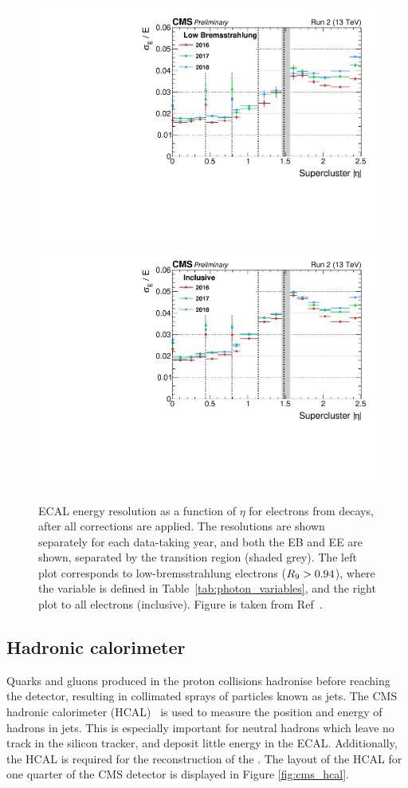 \begin{figure}
  \centering
  \includegraphics[width=.49\textwidth]{Figures/cms/final_Resolution_RunII_LowBremsstrahlung.pdf}
  \includegraphics[width=.49\textwidth]{Figures/cms/final_Resolution_RunII_Inclusive.pdf}
  \caption[Final ECAL energy resolution]
  {
    ECAL energy resolution as a function of $\eta$ for electrons from \Zee decays, after all corrections are applied. The resolutions are shown separately for each data-taking year, and both the EB and EE are shown, separated by the transition region (shaded grey). The left plot corresponds to low-bremsstrahlung electrons ($R_9>0.94$), where the variable \RNINE is defined in Table~\ref{tab:photon_variables}, and the right plot to all electrons (inclusive). Figure is taken from Ref~\cite{CMS-DP-2020-021}.
  }
  \label{fig:ecal_energy_resolution}
\end{figure}

\subsection{Hadronic calorimeter}\label{sec:cms_hcal}
Quarks and gluons produced in the proton collisions hadronise before reaching the detector, resulting in collimated sprays of particles known as jets. The CMS hadronic calorimeter (HCAL)~\cite{Chatrchyan:2008zzk,CMS:1997xji} is used to measure the position and energy of hadrons in jets. This is especially important for neutral hadrons which leave no track in the silicon tracker, and deposit little energy in the ECAL. Additionally, the HCAL is required for the reconstruction of the \met. The layout of the HCAL for one quarter of the CMS detector is displayed in Figure \ref{fig:cms_hcal}.


